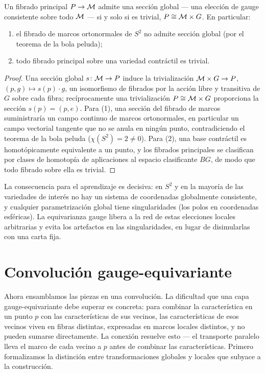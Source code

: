\begin{proposition}
\label{prop:gauge:obstruction}
Un fibrado principal $P \to \mathcal{M}$ admite una secci\'on global --- una elecci\'on
de gauge consistente sobre todo $\mathcal{M}$ --- si y solo si es trivial,
$P \cong \mathcal{M} \times G$. En particular:
\begin{enumerate}
  \item el fibrado de marcos ortonormales de $S^2$ no admite secci\'on global
    (por el teorema de la bola peluda);
  \item todo fibrado principal sobre una variedad contr\'actil es trivial.
\end{enumerate}
\end{proposition}

\begin{proof}
Una secci\'on global $s\colon \mathcal{M} \to P$ induce la trivializaci\'on
$\mathcal{M} \times G \to P$, $(p, g) \mapsto s(p) \cdot g$, un isomorfismo de fibrados
por la acci\'on libre y transitiva de $G$ sobre cada fibra; rec\'iprocamente una
trivializaci\'on $P \cong \mathcal{M} \times G$ proporciona la secci\'on $s(p) = (p,
e)$. Para (1), una secci\'on del fibrado de marcos suministrar\'ia un campo
continuo de marcos ortonormales, en particular un campo vectorial tangente que no
se anula en ning\'un punto, contradiciendo el teorema de la bola peluda
($\chi(S^2) = 2 \neq 0$). Para (2), una base contr\'actil es homot\'opicamente
equivalente a un punto, y los fibrados principales se clasifican por clases de
homotop\'ia de aplicaciones al espacio clasificante $BG$, de modo que todo
fibrado sobre ella es trivial.
\end{proof}

La consecuencia para el aprendizaje es decisiva: en $S^2$ y en la mayor\'ia de
las variedades de inter\'es no hay un sistema de coordenadas globalmente
consistente, y cualquier parametrizaci\'on global tiene singularidades (los polos
en coordenadas esf\'ericas). La equivarianza gauge libera a la red de estas
elecciones locales arbitrarias y evita los artefactos en las singularidades, en
lugar de disimularlas con una carta fija.

\section{Convoluci\'on gauge-equivariante}
\label{sec:gauge:conv}

Ahora ensamblamos las piezas en una convoluci\'on. La dificultad que una capa
gauge-equivariante debe superar es concreta: para combinar la caracter\'istica en
un punto $p$ con las caracter\'isticas de sus vecinos, las caracter\'isticas de
esos vecinos viven en fibras distintas, expresadas en marcos locales distintos, y
no pueden sumarse directamente. La conexi\'on resuelve esto --- el transporte
paralelo lleva el marco de cada vecino a $p$ antes de combinar las
caracter\'isticas. Primero formalizamos la distinci\'on entre transformaciones
globales y locales que subyace a la construcci\'on.

